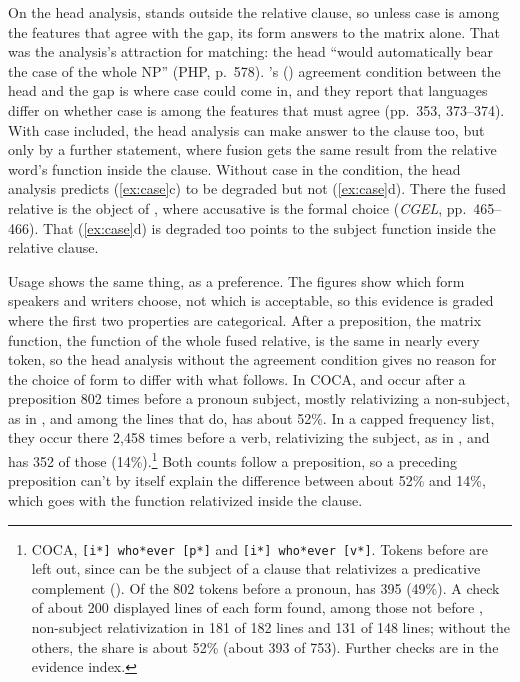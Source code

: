 On the head analysis,  stands outside the relative clause, so unless case is among the features that agree with the gap, its form answers to the matrix alone. That was the analysis's attraction for matching: the head \enquote{would automatically bear the case of the whole NP} (PHP, p.~578). \citeauthor{bresnan1978free}'s (\citeyear{bresnan1978free}) agreement condition between the head and the gap is where case could come in, and they report that languages differ on whether case is among the features that must agree (pp.~353, 373--374). With case included, the head analysis can make  answer to the clause too, but only by a further statement, where fusion gets the same result from the relative word's function inside the clause. Without case in the condition, the head analysis predicts (\ref{ex:case}c) to be degraded but not (\ref{ex:case}d). There the fused relative is the object of , where accusative is the formal choice (\textit{CGEL}, pp.~465--466). That (\ref{ex:case}d) is degraded too points to the subject function inside the relative clause.

Usage shows the same thing, as a preference. The figures show which form speakers and writers choose, not which is acceptable, so this evidence is graded where the first two properties are categorical. After a preposition, the matrix function, the function of the whole fused relative, is the same in nearly every token, so the head analysis without the agreement condition gives no reason for the choice of form to differ with what follows. In COCA,  and  occur after a preposition 802 times before a pronoun subject, mostly relativizing a non-subject, as in , and among the lines that do,  has about 52\%. In a capped frequency list, they occur there 2,458 times before a verb, relativizing the subject, as in , and  has 352 of those (14\%).\footnote{COCA, \texttt{[i*] who*ever [p*]} and \texttt{[i*] who*ever [v*]}. Tokens before  are left out, since  can be the subject of a clause that relativizes a predicative complement (). Of the 802 tokens before a pronoun,  has 395 (49\%). A check of about 200 displayed lines of each form found, among those not before , non-subject relativization in 181 of 182  lines and 131 of 148  lines; without the others, the share is about 52\% (about 393 of 753). Further checks are in the evidence index.} Both counts follow a preposition, so a preceding preposition can't by itself explain the difference between about 52\% and 14\%, which goes with the function relativized inside the clause.

